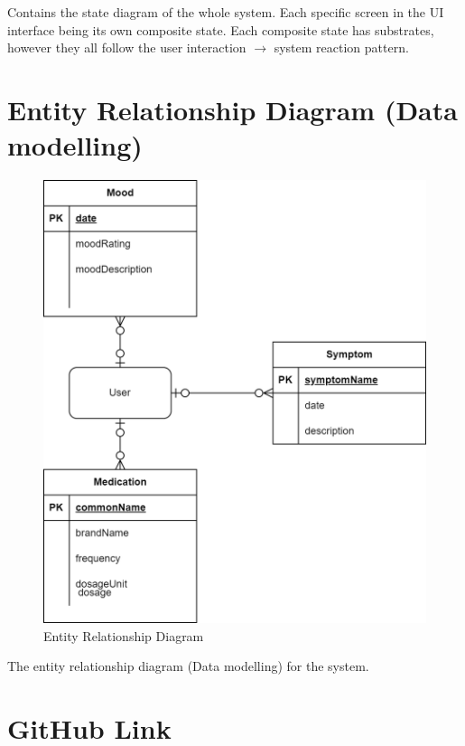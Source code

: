 \documentclass[11pt]{article}
\begin{document}
    Contains the state diagram of the whole system.
    Each specific screen in the UI interface being its own composite state.
    Each composite state has substrates, however they all follow the user interaction $\rightarrow$ system reaction pattern.

    \pagebreak


    \section{Entity Relationship Diagram (Data modelling)}\label{sec:er--diagram-(data-modelling)}

    \begin{figure}[H]
        \centering
        \includegraphics[width=\textwidth]{Diagrams/Entity Relationship Diagram}
        \caption{Entity Relationship Diagram}
        \label{fig:figure6}
    \end{figure}

    The entity relationship diagram (Data modelling) for the system.

    \pagebreak


    \section{GitHub Link}\label{sec:github-link}
\end{document}
